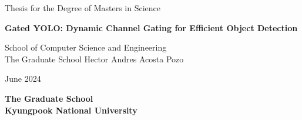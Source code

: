 \begin{titlepage}
    \begin{center}
    	\textmd{\large Thesis for the Degree of Masters in Science}  
        \vfill

        \textbf{\fontsize{21}{11}\selectfont Gated YOLO: Dynamic Channel Gating for Efficient Object Detection}  
        \vfill
        
        \textnormal{\large School of Computer Science and Engineering\\ The Graduate School          } 
        \vfill
        \textnormal{\Large Hector Andres Acosta Pozo}
        \vfill
        \vfill
        
        
        \textnormal{\large June 2024}
        
        \textbf{\Large The Graduate School \\ Kyungpook National University}
        \vfill
    \end{center}
\end{titlepage}